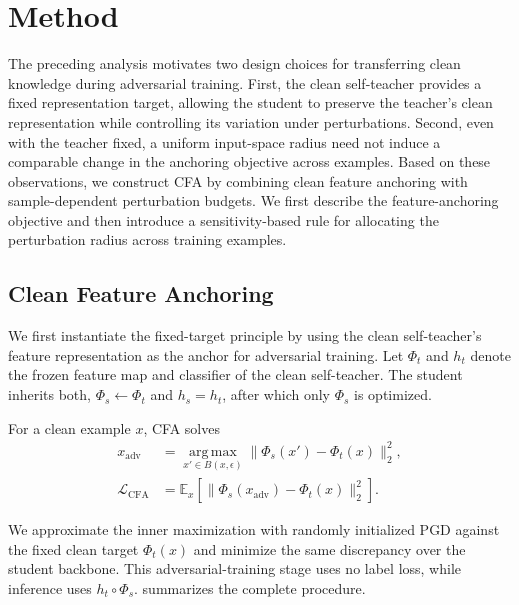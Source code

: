 \section{Method}
\label{sec:method}

The preceding analysis motivates two design choices for transferring clean
knowledge during adversarial training. First, the clean self-teacher provides
a fixed representation target, allowing the student to preserve the teacher's
clean representation while controlling its variation under perturbations.
Second, even with the teacher fixed, a uniform input-space radius need not
induce a comparable change in the anchoring objective across examples.
Based on these observations, we construct CFA by combining clean feature
anchoring with sample-dependent perturbation budgets. We first describe the
feature-anchoring objective and then introduce a sensitivity-based rule for
allocating the perturbation radius across training examples.


\subsection{Clean Feature Anchoring}
\label{sec:anchor}

We first instantiate the fixed-target principle by using the clean
self-teacher's feature representation as the anchor for adversarial training.
Let \(\Phi_t\) and \(h_t\) denote the frozen feature map and classifier of
the clean self-teacher. The student inherits both,
\(\Phi_s\leftarrow\Phi_t\) and \(h_s=h_t\), after which only \(\Phi_s\)
is optimized.

For a clean example \(x\), CFA solves
\begin{equation}
\begin{aligned}
x_{\mathrm{adv}}
&=
\operatorname*{arg\,max}_{x'\in B(x,\epsilon)}
\lVert\Phi_s(x')-\Phi_t(x)\rVert_2^2,\\
\mathcal L_{\mathrm{CFA}}
&=
\mathbb E_x
\left[
\lVert\Phi_s(x_{\mathrm{adv}})-\Phi_t(x)\rVert_2^2
\right].
\end{aligned}
\label{eqn:anchor}
\end{equation}

We approximate the inner maximization with randomly initialized PGD against
the fixed clean target \(\Phi_t(x)\) and minimize the same discrepancy over
the student backbone. This adversarial-training stage uses no label loss,
while inference uses \(h_t\circ\Phi_s\).
 summarizes the complete procedure.


